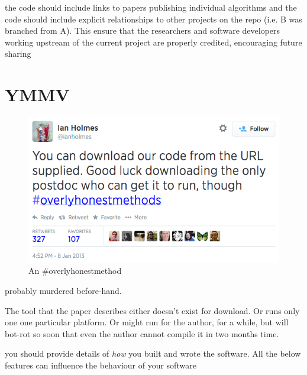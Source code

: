\documentclass[conference]{IEEEtran}
\begin{document}
the code should include links to papers publishing individual
algorithms and the code should include explicit relationships to other
projects on the repo (i.e. B was branched from A). This ensure that
the researchers and software developers working upstream of the
current project are properly credited, encouraging future sharing


\section{YMMV}

\begin{figure}[!ht]
\centering
\includegraphics[width=\columnwidth]{overlyhonesttweet.png}
\caption{An \#overlyhonestmethod}
\label{fig:overlyhonestmethod} 
\end{figure}



probably murdered before-hand. 

The tool that the paper describes either doesn't exist for
download. Or runs only one one particular platform. Or might run for
the author, for a while, but will bot-rot so soon that even the author
cannot compile it in two months time.



you should provide details of \emph{how} you built and wrote the software. All the below features can influence the behaviour of your software
\end{document}
